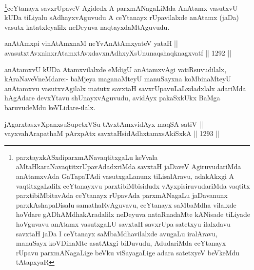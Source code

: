 \begin{artha}
\footnote{parxtayxkASxdiparxmANavaqtitxgaLu keVvala aMtaHkaraNavaqtitxrUpavAdadxriMda savxtaH jaDaveV AgiruvudariMda anAtamxvAda GaTapaTAdi vasutxgaLanunx tiLisalAravu, adakAkxgi A vaqtitxgaLalilx ceYtanayxvu parxtibiMbisidudx vAyxpisiruvudariMda vaqtitx parxtibiMbitavAda ceYtanayx rUpavAda parxmANagaLu jaDavanunx parxkAshapaDisalu samathaRvAguvavu, ceYtanayx saMbaMdha vilalxde hoVdare gADhAMdhakAradalilx neDeyuva nataRnadaMte kANisade tiLiyade hoVguvavu anAtamx vasutxgaLU savxtaH savxrUpa satetxyu ilalxdavu savxtaH jaDa I ceYtanayx saMbaMdhavilalxde avugaLu iralAravu, manuSayx koVDinaMte asatAtxgi biDuvudu, AdudariMda ceYtanayx rUpavu parxmANagaLige beVku viSayagaLige adara satetxyeV beVkeMdu tAtapxyaR}ceYtanayx savxrUpaveV Agidedx A parxmANagaLiMda AnAtamx vasutxvU kUDa tiLiyalu sAdhayxvAguvudu A ceYtanayx rUpavilalxde anAtamx (jaDa) vasutx katatxleyalilx neDeyuva naqtayxdaMtAguvudu.
\end{artha}


\begin{shl}
anAtAmx\s pi vinA\s \s tAmxnaM neYvAnAtAmxyateV yataH || \\
avasutxtAvxninxrAtamxtAvxdavxnAdhxyXsUnunaqshaqknagxvatf ||  1292 ||  
\end{shl}

\begin{artha}
anAtamxvU kUDa Atamxvilalxde eMdigU anAtamxvAgi vatiRsuvudilalx, kAraNaveVneMdare:- baMjeya maganaMteyU manuSayxna koMbinaMteyU anAtamxvu vasutxvAgilalx matutx savxtaH savxrUpavuLaLxdadxlalx adariMda hAgAdare devxYtavu shUnayxvAguvudu, avidAyx pakaSxkUkx BaMga baruvudeMdu keVLidare-ilalx.
\end{artha}


\begin{shl}
\footnotemark[2]jAgarxtasxvXpanxsuSupetxVSu tAvxtAmxvidAyx maqSA satiV || \\
vayxvahArapathaM pArxpAtx savxtaHsidAdhxtamxsAkiSxkA ||  1293 ||  
\end{shl}

